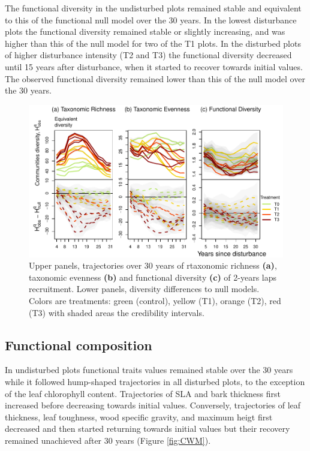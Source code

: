 \documentclass[fleqn,10pt]{ArtEcoFoG} %
\begin{document}
The functional diversity in the undisturbed plots remained stable and
equivalent to this of the functional null model over the 30 years. In
the lowest disturbance plots the functional diversity remained stable or
slightly increasing, and was higher than this of the null model for two
of the T1 plots. In the disturbed plots of higher disturbance intensity
(T2 and T3) the functional diversity decreased until 15 years after
disturbance, when it started to recover towards initial values. The
observed functional diversity remained lower than this of the null model
over the 30 years.

\begin{figure}

{\centering \includegraphics{RecruitmentTrajectories_files/figure-latex/DivTraj-1} 

}

\caption{Upper panels, trajectories over 30 years of rtaxonomic richness \textbf{(a)}, taxonomic evenness \textbf{(b)} and functional diversity \textbf{(c)} of 2-years laps recruitment. Lower panels, diversity differences to null models. Colors are treatments: green (control), yellow (T1), orange (T2), red (T3) with shaded areas the credibility intervals.}\label{fig:DivTraj}
\end{figure}

\subsection{Functional composition}\label{functional-composition}

In undisturbed plots functional traits values remained stable over the
30 years while it followed hump-shaped trajectories in all disturbed
plots, to the exception of the leaf chlorophyll content. Trajectories of
SLA and bark thickness first increased before decreasing towards initial
values. Conversely, trajectories of leaf thickness, leaf toughness, wood
specific gravity, and maximum heigt first decreased and then started
returning towards initial values but their recovery remained unachieved
after 30 years (Figure \ref{fig:CWM}).
\end{document}
